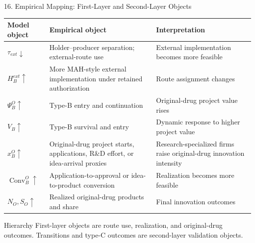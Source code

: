 \documentclass[aspectratio=169,11pt]{beamer}
\begin{document}
\begin{frame}{16. Empirical Mapping: First-Layer and Second-Layer Objects}
\tiny
\begin{center}
\begin{tabular}{p{}p{}p{}}
\toprule
\textbf{Model object} & \textbf{Empirical object} & \textbf{Interpretation} \\
\midrule
\(\tau_{ext}\downarrow\) & Holder--producer separation; external-route use & External implementation becomes more feasible \\
\(H_{B}^{ext}\uparrow\) & More MAH-style external implementation under retained authorization & Route assignment changes \\
\(\Psi_B^O\uparrow\) & Type-B entry and continuation & Original-drug project value rises \\
\(V_B\uparrow\) & Type-B survival and entry & Dynamic response to higher project value \\
\(x_B^O\uparrow\) & Original-drug project starts, applications, R\&D effort, or idea-arrival proxies & Research-specialized firms raise original-drug innovation intensity \\
\(\operatorname{Conv}_B^O\uparrow\) & Application-to-approval or idea-to-product conversion & Realization becomes more feasible \\
\(N_O,S_O\uparrow\) & Realized original-drug products and share & Final innovation outcomes \\
\bottomrule
\end{tabular}
\end{center}

\vspace{0.08cm}
\begin{block}{Hierarchy}
First-layer objects are route use, realization, and original-drug outcomes. Transitions and type-C outcomes are second-layer validation objects.
\end{block}
\end{frame}
\end{document}
